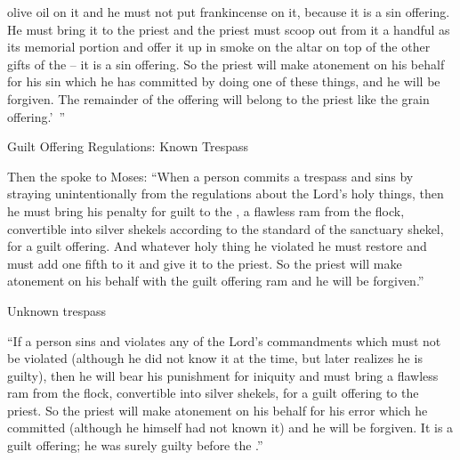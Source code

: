 {olive oil
on
it and he must not
put
frankincense
on
it, because
it is a sin offering.
He must bring
it to
the priest
and the priest
must scoop
out from
it a handful
as its memorial
portion and offer it up in smoke
on the altar
on
top of the other gifts
of the {} –
it
is a sin offering.
So the priest
will make atonement
on
his behalf for his sin
which
he has committed
by doing one
of these
things, and he will be forgiven.
The remainder of the offering will belong to the priest
like the grain offering.’ ”
\par }{\SH Guilt Offering Regulations: Known Trespass
\par }{\PP {}Then the
{}
spoke
to
Moses:
“When a person
commits
a trespass
and sins
by straying unintentionally
from the regulations about the Lord’s
holy
things, then he must bring
his penalty for guilt
to the
{}, a flawless
ram
from
the flock,
convertible
into silver
shekels
according to the standard of the sanctuary
shekel,
for a guilt offering.
And whatever
holy
thing
he violated
he must restore
and must add
one fifth
to it and give
it to the
priest.
So the priest
will make atonement
on
his behalf with the guilt offering
ram
and he will be forgiven.”
\par }{\SH Unknown trespass
\par }{\PP {}“If
a person
sins
and violates
any
of the Lord’s
commandments
which
must not
be violated
(although he did not
know
it at the time, but later realizes he is guilty), then he will bear
his punishment for iniquity
and must bring
a flawless
ram
from
the flock,
convertible into silver shekels,
for a guilt offering
to
the priest.
So the priest
will make atonement
on
his behalf for his error
which
he committed (although
he himself had not
known
it) and he will be forgiven.
It is a guilt offering;
he
was surely guilty
before the
{}.”

}
